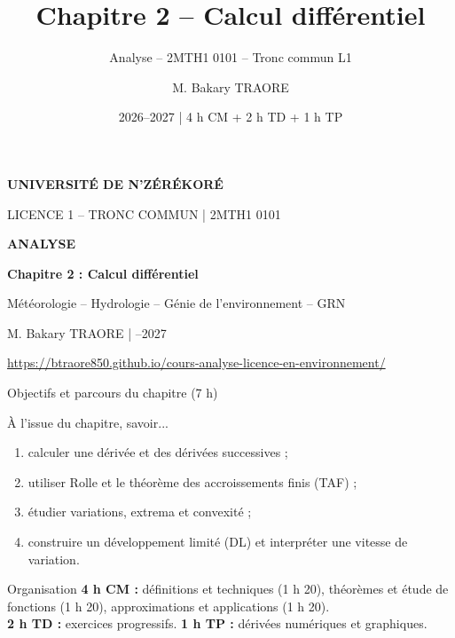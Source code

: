 \documentclass[aspectratio=169,11pt]{beamer}
\title{Chapitre 2 -- Calcul différentiel}
\subtitle{Analyse -- 2MTH1 0101 -- Tronc commun L1}
\author{M. Bakary TRAORE}
\date{2026--2027 | 4 h CM + 2 h TD + 1 h TP}
\begin{document}
\begin{frame}[plain]
\vfill\begin{center}
{\color{white}\Large\bfseries UNIVERSITÉ DE N'ZÉRÉKORÉ\par}\vspace{.25cm}
{\color{white!85}\normalsize LICENCE 1 -- TRONC COMMUN \quad | \quad 2MTH1 0101\par}\vspace{.55cm}
{\color{white}\fontsize{30}{34}\selectfont\bfseries ANALYSE\par}\vspace{.45cm}
{\color{soleil}\LARGE\bfseries Chapitre 2 : Calcul différentiel\par}\vspace{.4cm}
{\color{white!85}\normalsize Météorologie -- Hydrologie -- Génie de l'environnement -- GRN\par}\vspace{.35cm}
{\color{white!75}\normalsize M. Bakary TRAORE \quad | --2027\par}\vspace{.2cm}
{\color{white!75}\footnotesize\url{https://btraore850.github.io/cours-analyse-licence-en-environnement/}\par}
\end{center}\vfill
\end{frame}

\begin{frame}{Objectifs et parcours du chapitre (7 h)}
\begin{block}{À l'issue du chapitre, savoir...}
\begin{enumerate}
\item calculer une dérivée et des dérivées successives ;
\item utiliser Rolle et le théorème des accroissements finis (TAF) ;
\item étudier variations, extrema et convexité ;
\item construire un développement limité (DL) et interpréter une vitesse de variation.
\end{enumerate}
\end{block}
\begin{exampleblock}{Organisation}
\textbf{4 h CM :} définitions et techniques (1 h 20), théorèmes et étude de fonctions (1 h 20), approximations et applications (1 h 20).\\
\textbf{2 h TD :} exercices progressifs. \quad \textbf{1 h TP :} dérivées numériques et graphiques.
\end{exampleblock}
\end{frame}
\end{document}
